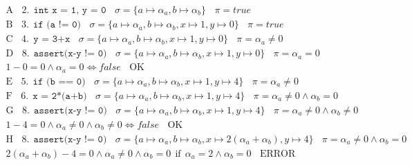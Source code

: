 \documentclass[10pt]{article}
\begin{document}
\begin{align*}\mbox{A} ~~~~ 2.~~\texttt{int x = 1, y = 0} ~~~~ \sigma=\{ a\mapsto \alpha_a, b\mapsto \alpha_b \} ~~~~ \pi=true \\
\mbox{B} ~~~~ 3.~~\texttt{if (a != 0)} ~~~~ \sigma=\{ a\mapsto \alpha_a, b\mapsto \alpha_b, x\mapsto 1, y\mapsto 0 \} ~~~~ \pi=true \\
\mbox{C} ~~~~ 4.~~\texttt{y = 3+x} ~~~~ \sigma=\{ a\mapsto \alpha_a, b\mapsto \alpha_b, x\mapsto 1, y\mapsto 0 \} ~~~~ \pi=\alpha_a\neq 0 \\
\mbox{D} ~~~~ 8.~~\texttt{assert(x-y != 0)} ~~~~ \sigma=\{ a\mapsto \alpha_a, b\mapsto \alpha_b, x\mapsto 1, y\mapsto 0 \} ~~~~ \pi=\alpha_a= 0 \\
1-0 = 0 \wedge \alpha_a = 0\Longleftrightarrow false ~~~~ \mbox{OK} \\
\mbox{E} ~~~~ 5.~~\texttt{if (b == 0)} ~~~~ \sigma=\{ a\mapsto \alpha_a, b\mapsto \alpha_b, x\mapsto 1, y\mapsto 4 \} ~~~~ \pi=\alpha_a\neq 0 \\
\mbox{F} ~~~~ 6.~~\texttt{x = 2*(a+b)} ~~~~ \sigma=\{ a\mapsto \alpha_a, b\mapsto \alpha_b, x\mapsto 1, y\mapsto 4 \} ~~~~ \pi=\alpha_a\neq 0 \wedge \alpha_b = 0 \\
\mbox{G} ~~~~ 8.~~\texttt{assert(x-y != 0)} ~~~~ \sigma=\{ a\mapsto \alpha_a, b\mapsto \alpha_b, x\mapsto 1, y\mapsto 4 \} ~~~~ \pi=\alpha_a \neq 0 \wedge \alpha_b \neq 0 \\
1-4 = 0 \wedge \alpha_a \neq 0 \wedge \alpha_b \neq 0\Longleftrightarrow false ~~~~ \mbox{OK} \\
\mbox{H} ~~~~ 8.~~\texttt{assert(x-y != 0)} ~~~~ \sigma=\{ a\mapsto \alpha_a, b\mapsto \alpha_b, x\mapsto 2(\alpha_a+\alpha_b), y\mapsto 4 \} ~~~~ \pi=\alpha_a \neq 0 \wedge \alpha_b = 0 \\
2(\alpha_a+\alpha_b)-4 = 0 \wedge \alpha_a \neq 0 \wedge \alpha_b = 0~~\mbox{if}~~\alpha_a=2\wedge\alpha_b=0 ~~~~ \mbox{ERROR} \\
\end{align*}
\end{document}
